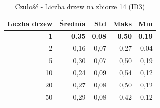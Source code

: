 \begin{table}[htbp]
\centering
\small
\setlength{\tabcolsep}{6pt}
\renewcommand{\arraystretch}{1.2}
\caption{Czułość - Liczba drzew na zbiorze 14 (ID3)}
\label{tab:ID3_tree_count_14_recall}
\begin{tabular}{r|r|r|r|r}
\toprule
Liczba drzew & Średnia & Std & Maks & Min \\
\hline
\textbf{1} & \textbf{0.35} & \textbf{0.08} & \textbf{0.50} & \textbf{0.19} \\
2 & 0,16 & 0,07 & 0,27 & 0,04 \\
5 & 0,30 & 0,07 & 0,50 & 0,19 \\
10 & 0,24 & 0,09 & 0,54 & 0,12 \\
20 & 0,27 & 0,08 & 0,50 & 0,12 \\
50 & 0,29 & 0,08 & 0,42 & 0,12 \\
\bottomrule
\end{tabular}
\end{table}